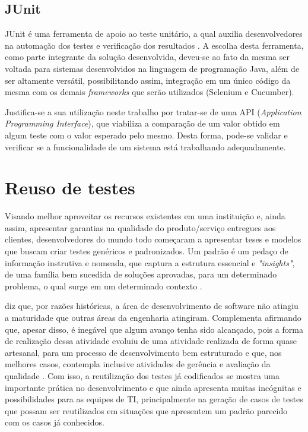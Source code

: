 \documentclass[tg]{mdtufsm}
\begin{document}
\subsection{JUnit}
JUnit é uma ferramenta de apoio ao teste unitário, a qual auxilia desenvolvedores na automação dos testes e verificação dos resultados \cite{biasi2006geraccao}. A escolha desta ferramenta, como parte integrante da solução desenvolvida, deveu-se ao fato da mesma ser voltada para sistemas desenvolvidos na linguagem de programação Java, além de ser altamente versátil, possibilitando assim, integração em um único código da mesma com os demais \emph{frameworks} que serão utilizados (Selenium e Cucumber).

Justifica-se a sua utilização neste trabalho por tratar-se de uma API (\emph{Application Programming Interface}), que viabiliza a comparação de um valor obtido em algum teste com o valor esperado pelo mesmo. Desta forma, pode-se validar e verificar se
a funcionalidade de um sistema está trabalhando adequadamente.

\section{Reuso de testes}

Visando melhor aproveitar os recursos existentes em uma instituição e, ainda assim, apresentar garantias na qualidade do produto/serviço entregues aos clientes, desenvolvedores do mundo todo começaram a apresentar
teses e modelos que buscam criar testes genéricos e padronizados. Um padrão é um pedaço de informação instrutiva e nomeada, que captura a estrutura essencial
e \emph{"insights"}, de uma família bem sucedida de soluções aprovadas, para um determinado problema, o qual surge em um determinado contexto \cite{cagnin2004reuso}.

\citeauthor{guizzardi2000desenvolvimento} diz que, por razões históricas, a área de desenvolvimento de software não atingiu a maturidade que outras áreas da engenharia atingiram. Complementa afirmando que, apesar disso, é inegável que algum avanço tenha sido alcançado, pois a forma de realização dessa atividade evoluiu de uma atividade realizada de forma quase artesanal, para um processo de
desenvolvimento bem estruturado e que, nos melhores casos, contempla inclusive atividades de gerência e avaliação da qualidade \cite{guizzardi2000desenvolvimento}.
Com isso, a reutilização dos testes já codificados se mostra uma importante prática no desenvolvimento e que ainda apresenta muitas incógnitas e possibilidades para as equipes de TI,
principalmente na geração de casos de testes que possam ser reutilizados em situações que apresentem um padrão parecido com os casos já conhecidos.
\end{document}
